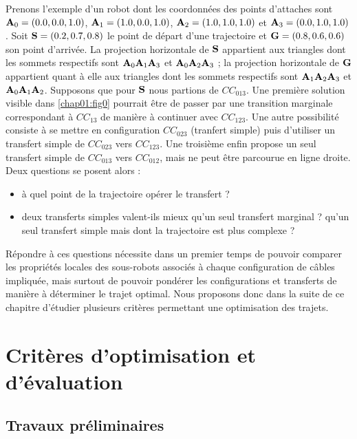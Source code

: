 Prenons l'exemple d'un robot dont les coordonn\'ees des points d'attaches sont 
${\bf A}_0 = (0.0, 0.0, 1.0)$, ${\bf A}_1 = (1.0, 0.0, 1.0)$, ${\bf A}_2 = 
(1.0, 1.0, 1.0)$ et ${\bf A}_3 = (0.0, 1.0, 1.0)$. Soit ${\bf S} = (0.2, 0.7, 
0.8)$ le point de d\'epart d'une trajectoire et ${\bf G} = (0.8, 0.6, 0.6)$ son 
point d'arriv\'ee. La projection horizontale de ${\bf S}$ appartient aux 
triangles dont les sommets respectifs sont ${\bf A}_0{\bf A}_1{\bf A}_3$ et 
${\bf A}_0{\bf A}_2{\bf A}_3$ ; la projection horizontale de ${\bf G}$ 
appartient quant \`a elle aux triangles dont les sommets respectifs sont ${\bf 
A}_1{\bf A}_2{\bf A}_3$ et ${\bf A}_0{\bf A}_1{\bf A}_2$. Supposons que pour 
${\bf S}$ nous partions de $CC_{013}$. Une premi\`ere solution visible 
dans \ref{chap01:fig0} pourrait \^etre de passer par une transition marginale 
correspondant \`a $CC_{13}$ de mani\`ere \`a continuer avec $CC_{123}$. Une 
autre possibilit\'e consiste \`a se mettre en configuration $CC_{023}$ 
(tranfert simple) puis d'utiliser un transfert simple de $CC_{023}$ vers 
$CC_{123}$. Une troisi\`eme enfin propose un seul transfert simple de 
$CC_{013}$ vers $CC_{012}$, mais ne peut \^etre parcourue en ligne droite. Deux 
questions se posent alors :
\begin{itemize}
 \item \`a quel point de la trajectoire op\'erer le transfert ?
  \item  deux transferts simples valent-ils mieux qu'un seul transfert marginal 
? qu'un seul transfert simple mais dont la trajectoire est plus complexe ? 
\end{itemize}

R\'epondre \`a ces questions n\'ecessite dans un premier temps de 
pouvoir comparer les propri\'et\'es locales des sous-robots associ\'es \`a 
chaque configuration de c\^ables impliqu\'ee, mais surtout de pouvoir 
pond\'erer les configurations et transferts de mani\`ere \`a d\'eterminer le 
trajet optimal. Nous proposons donc dans la suite de ce chapitre d'\'etudier 
plusieurs crit\`eres permettant une optimisation des trajets.

\section{Crit\`eres d'optimisation et d'\'evaluation}

\subsection{Travaux pr\'eliminaires}

